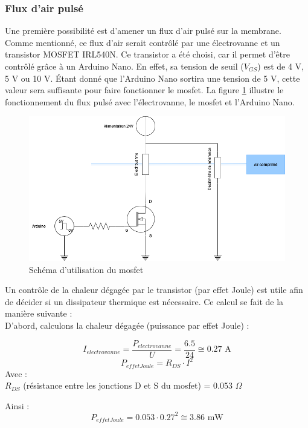 \subsubsection{Flux d'air pulsé}
Une première possibilité est d'amener un flux d'air pulsé sur la membrane. Comme mentionné, ce flux d'air serait contrôlé par une électrovanne et un
transistor MOSFET IRL540N. Ce transistor a été choisi, car il permet d'être contrôlé grâce à un Arduino Nano. En effet, sa tension de seuil
($V_{GS}$) est de 4 V, 5 V ou 10 V. Étant donné que l'Arduino Nano sortira une tension de 5 V, cette valeur sera suffisante pour faire fonctionner
le \gls{mosfet}. La figure \ref{fig:MOSFET} illustre le fonctionnement du flux pulsé avec l'électrovanne, le \gls{mosfet} et l'Arduino Nano. 
\begin{figure}[H]
    \centering
    \includegraphics[scale=0.6]{assets/figures/MOSFET.png}
    \caption{Schéma d'utilisation du \gls{mosfet}}
    \label{fig:MOSFET}
\end{figure}
Un contrôle de la chaleur dégagée par le transistor (par effet Joule) est utile afin de décider si un dissipateur thermique est nécessaire. Ce calcul se fait
de la manière suivante :\\

D'abord, calculons la chaleur dégagée (puissance par effet Joule) :

\[I_{electrovanne} = \frac{P_{electrovanne}}{U} = \frac{6.5}{24} \cong 0.27 \text{ A} \]
\[P_{effetJoule} = R_{DS}\cdot I^2\]
Avec :\\
$R_{DS}$ (résistance entre les jonctions D et S du \gls{mosfet}) = 0.053 $\Omega$

Ainsi :
\begin{equation}
    P_{effetJoule} = 0.053\cdot 0.27^2 \cong 3.86 \text{ mW}
\end{equation}

